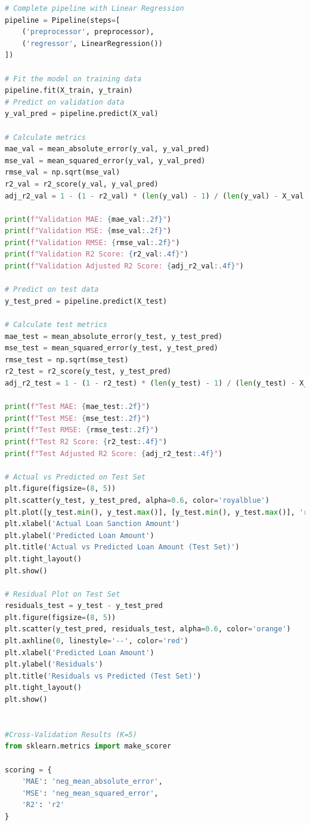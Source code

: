 \documentclass{article}
\begin{document}
\begin{lstlisting}[language=Python, caption=Iris Dataset Classification, basicstyle=\ttfamily\small, breaklines=true]
# Complete pipeline with Linear Regression
pipeline = Pipeline(steps=[
    ('preprocessor', preprocessor),
    ('regressor', LinearRegression())
])

# Fit the model on training data
pipeline.fit(X_train, y_train)
# Predict on validation data
y_val_pred = pipeline.predict(X_val)

# Calculate metrics
mae_val = mean_absolute_error(y_val, y_val_pred)
mse_val = mean_squared_error(y_val, y_val_pred)
rmse_val = np.sqrt(mse_val)
r2_val = r2_score(y_val, y_val_pred)
adj_r2_val = 1 - (1 - r2_val) * (len(y_val) - 1) / (len(y_val) - X_val.shape[1] - 1)

print(f"Validation MAE: {mae_val:.2f}")
print(f"Validation MSE: {mse_val:.2f}")
print(f"Validation RMSE: {rmse_val:.2f}")
print(f"Validation R2 Score: {r2_val:.4f}")
print(f"Validation Adjusted R2 Score: {adj_r2_val:.4f}")

# Predict on test data
y_test_pred = pipeline.predict(X_test)

# Calculate test metrics
mae_test = mean_absolute_error(y_test, y_test_pred)
mse_test = mean_squared_error(y_test, y_test_pred)
rmse_test = np.sqrt(mse_test)
r2_test = r2_score(y_test, y_test_pred)
adj_r2_test = 1 - (1 - r2_test) * (len(y_test) - 1) / (len(y_test) - X_test.shape[1] - 1)

print(f"Test MAE: {mae_test:.2f}")
print(f"Test MSE: {mse_test:.2f}")
print(f"Test RMSE: {rmse_test:.2f}")
print(f"Test R2 Score: {r2_test:.4f}")
print(f"Test Adjusted R2 Score: {adj_r2_test:.4f}")

# Actual vs Predicted on Test Set
plt.figure(figsize=(8, 5))
plt.scatter(y_test, y_test_pred, alpha=0.6, color='royalblue')
plt.plot([y_test.min(), y_test.max()], [y_test.min(), y_test.max()], 'r--')
plt.xlabel('Actual Loan Sanction Amount')
plt.ylabel('Predicted Loan Amount')
plt.title('Actual vs Predicted Loan Amount (Test Set)')
plt.tight_layout()
plt.show()

# Residual Plot on Test Set
residuals_test = y_test - y_test_pred
plt.figure(figsize=(8, 5))
plt.scatter(y_test_pred, residuals_test, alpha=0.6, color='orange')
plt.axhline(0, linestyle='--', color='red')
plt.xlabel('Predicted Loan Amount')
plt.ylabel('Residuals')
plt.title('Residuals vs Predicted (Test Set)')
plt.tight_layout()
plt.show()


#Cross-Validation Results (K=5)
from sklearn.metrics import make_scorer

scoring = {
    'MAE': 'neg_mean_absolute_error',
    'MSE': 'neg_mean_squared_error',
    'R2': 'r2'
}


\end{lstlisting}
\end{document}
